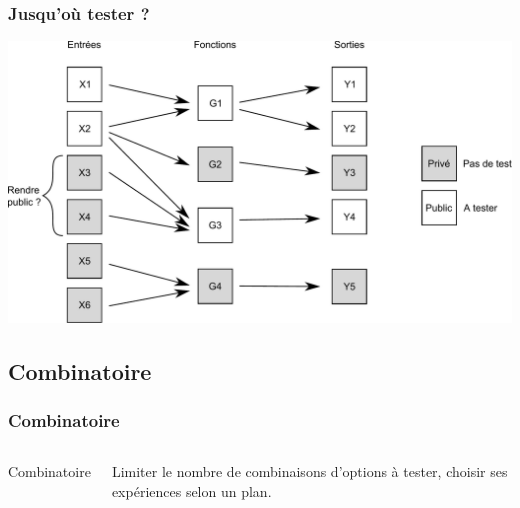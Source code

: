 \documentclass{beamer}
\begin{document}
\begin{frame}[containsverbatim]
\frametitle{Jusqu'où tester ?}

\begin{center}
\includegraphics[width=\textwidth]{publique-prive}
\end{center}

\end{frame}


\subsection{Combinatoire}

\begin{frame}
\frametitle{Combinatoire}
  \begin{columns}
    
    {\huge{Combinatoire}}
	
	Limiter le nombre de combinaisons d'options à tester, 
	choisir ses expériences selon un plan.
  \end{columns}
\end{frame}

\end{document}
